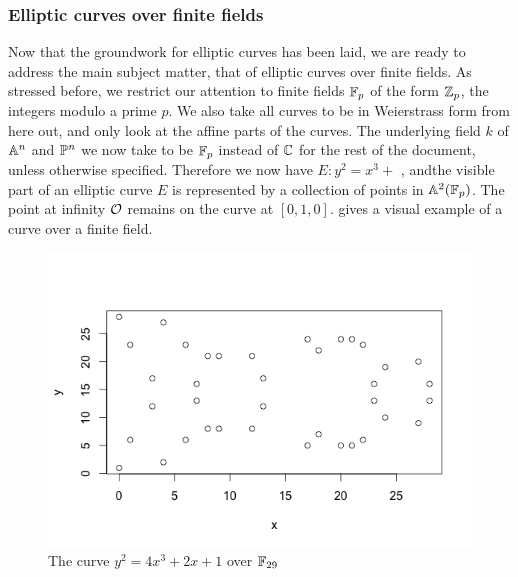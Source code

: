 \subsubsection{Elliptic curves over finite fields}
Now that the groundwork for elliptic curves has been laid, we are ready to address the main subject matter, that of elliptic curves over finite fields.
As stressed before, we restrict our attention to finite fields $\fp$ of the form $\zn[p]$, the integers modulo a prime $p$.
We also take all curves to be in Weierstrass form from here out, and only look at the affine parts of the curves.
The underlying field $k$ of $\an$ and $\pn$ we now take to be $\fp$ instead of $\C$ for the rest of the document, unless otherwise specified.
% 
% 
% 
% 
% 
Therefore we now have $E:y^2 = x^3 + $ , andthe visible part of an elliptic curve $E$ is represented by a collection of points in $\an[2](\fp)$.
The point at infinity $\pai$ remains on the curve at $[0,1,0]$.
 gives a visual example of a curve over a finite field.
\begin{figure}[htbp]
	\centering
	\includegraphics[scale=0.5]{../Figures/finiteellipticcurve.png}
	\caption{The curve $y^2 = 4x^3 + 2x + 1$ over $\fp[29]$}
	\label{finitecurve}
\end{figure}
